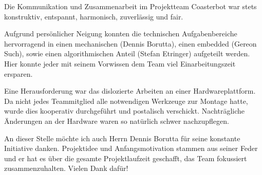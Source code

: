 
Die Kommunikation und Zusammenarbeit im Projektteam Coasterbot war stets konstruktiv, entspannt, harmonisch, zuverlässig und fair. 

Aufgrund persönlicher Neigung konnten die technischen Aufgabenbereiche hervorragend in einen mechanischen (Dennis Borutta), einen embedded (Gereon Such), sowie einen algorithmischen Anteil (Stefan Etringer) aufgeteilt werden. Hier konnte jeder mit seinem Vorwissen dem Team viel Einarbeitungszeit ersparen. 

Eine Herausforderung war das dislozierte Arbeiten an einer Hardwareplattform. Da nicht jedes Teammitglied alle notwendigen Werkzeuge zur Montage hatte, wurde dies kooperativ durchgeführt und postalisch verschickt. Nachträgliche Änderungen an der Hardware waren so natürlich schwer nachzupflegen. 

An dieser Stelle möchte ich auch Herrn Dennis Borutta für seine konstante Initiative danken. Projektidee und Anfangsmotivation stammen aus seiner Feder und er hat es über die gesamte Projektlaufzeit geschafft, das Team fokussiert zusammenzuhalten. Vielen Dank dafür!

